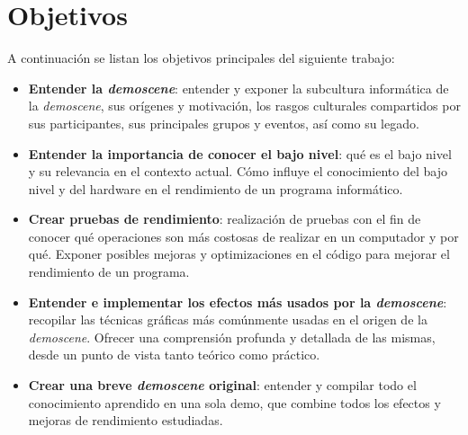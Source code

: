 
\chapter{Objetivos}

A continuación se listan los objetivos principales del siguiente trabajo:

\begin{itemize}
	\item \textbf{Entender la \emph{demoscene}}: entender y exponer la subcultura informática de la \emph{demoscene}, sus orígenes y motivación, los rasgos culturales compartidos por sus participantes, sus principales grupos y eventos, así como su legado.
	\item \textbf{Entender la importancia de conocer el bajo nivel}: qué es el bajo nivel y su relevancia en el contexto actual. Cómo influye el conocimiento del bajo nivel y del hardware en el rendimiento de un programa informático.
	\item \textbf{Crear pruebas de rendimiento}: realización de pruebas con el fin de conocer qué operaciones son más costosas de realizar en un computador y por qué. Exponer posibles mejoras y optimizaciones en el código para mejorar el rendimiento de un programa.
	\item \textbf{Entender e implementar los efectos más usados por la \emph{demoscene}}: recopilar las técnicas gráficas más comúnmente usadas en el origen de la \emph{demoscene}. Ofrecer una comprensión profunda y detallada de las mismas, desde un punto de vista tanto teórico como práctico. 
	\item \textbf{Crear una breve \emph{demoscene} original}: entender y compilar todo el conocimiento aprendido en una sola demo, que combine todos los efectos y mejoras de rendimiento estudiadas.
\end{itemize}